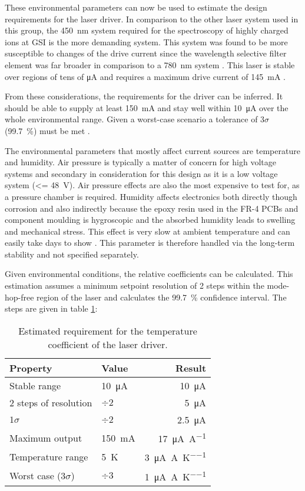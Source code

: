 These environmental parameters can now be used to estimate the design requirements for the laser driver. In comparison to the other laser system used in this group, the \qty{450}{\nm} system \cite{thesis_baus} required for the spectroscopy of highly charged ions \cite{thesis_alex} at GSI is the more demanding system. This system was found to be more susceptible to changes of the drive current since the wavelength selective filter element was far broader in comparison to a \qty{780}{\nm} system \cite{two_filter_paper}. This laser is stable over regions of tens of \unit{\uA} and requires a maximum drive current of \qty{145}{\mA} \cite{datasheet_osram_pl450b}.

From these considerations, the requirements for the driver can be inferred. It should be able to supply at least \qty{150}{\mA} and stay well within \qty{10}{\uA} over the whole environmental range. Given a worst-case scenario a tolerance of $3\sigma$ (\qty{99.7}{\percent}) must be met \cite{worst_case_design}.

The environmental parameters that mostly affect current sources are temperature and humidity. Air pressure is typically a matter of concern for high voltage systems \cite{IPC-2221B} and secondary in consideration for this design as it is a low voltage system (\qty{<= 48}{\V}). Air pressure effects are also the most expensive to test for, as a pressure chamber is required. Humidity affects electronics both directly though corrosion and also indirectly because the epoxy resin used in the FR-4 PCBs and component moulding is hygroscopic and the absorbed humidity leads to swelling and mechanical stress. This effect is very slow at ambient temperature and can easily take days to show \cite{epoxy_humidity}. This parameter is therefore handled via the long-term stability and not specified separately.

Given environmental conditions, the relative coefficients can be calculated. This estimation assumes a minimum setpoint resolution of 2 steps within the mode-hop-free region of the laser and calculates the \qty{99.7}{\percent} confidence interval. The steps are given in table \ref{tab:dgdrive_tempco}:

\begin{table}[hb]
    \centering
    \begin{tabular}{llr}
        \toprule
        Property& Value& Result \\
        \midrule
        Stable range & \qty{10}{\uA}& \qty{10}{\uA}\\
        2 steps of resolution  & $\div 2$& \qty{5}{\uA} \\
        $1 \sigma$  & $\div 2$& \qty{2.5}{\uA} \\
        Maximum output& \qty{150}{\mA}& \qty{17}{\uA \per \A}\\
        Temperature range& \qty{5}{\K}& \qty{3}{\uA \per \A \per \K}\\
        Worst case ($3 \sigma$)& $\div 3$& \qty{1}{\uA \per \A \per \K}\\
        \bottomrule
    \end{tabular}
    \caption{Estimated requirement for the temperature coefficient of the laser driver.}
    \label{tab:dgdrive_tempco}
\end{table}

